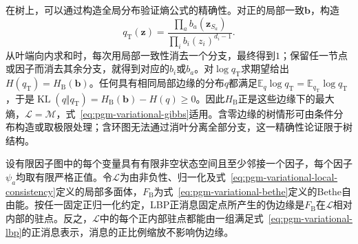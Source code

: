 在树上，可以通过构造全局分布验证熵公式的精确性。对正的局部一致$\bm b$，构造
\[
  q_{\mathrm T}(\bm z)=
    \frac{\prod_a b_a(\bm z_{S_a})}
         {\prod_i b_i(z_i)^{d_i-1}}.
\]
从叶端向内求和时，每次用局部一致性消去一个分支，最终得到$1$；保留任一节点或因子而消去其余分支，就得到对应的$b_i$或$b_a$。对$\log q_{\mathrm T}$求期望给出$H(q_{\mathrm T})=H_{\mathrm B}(\bm b)$。任何具有相同局部边缘的分布$q$都满足$\mathbb E_q\log q_{\mathrm T}=\mathbb E_{q_{\mathrm T}}\log q_{\mathrm T}$，于是$\operatorname{KL}(q\Vert q_{\mathrm T})=H_{\mathrm B}(\bm b)-H(q)\geq0$。因此$H_{\mathrm B}$正是这些边缘下的最大熵，$\mathcal L=\mathcal M$，式~\eqref{eq:pgm-variational-gibbs}适用。含零边缘的树情形可由条件分布构造或取极限处理；含环图无法通过消叶分离全部分支，这一精确性论证限于树结构。

\begin{theorem}[正消息固定点与Bethe驻点]
  \label{thm:pgm-variational-bp-stationary}
  设有限因子图中的每个变量具有有限非空状态空间且至少邻接一个因子，每个因子$\psi_a$均取有限严格正值。令$\mathcal L$为由非负性、归一化及式~\eqref{eq:pgm-variational-local-consistency}定义的局部多面体，$F_{\mathrm B}$为式~\eqref{eq:pgm-variational-bethe}定义的Bethe自由能。按任一固定正归一化约定，LBP正消息固定点所产生的伪边缘是$F_{\mathrm B}$在$\mathcal L$相对内部的驻点。反之，$\mathcal L$中的每个正内部驻点都能由一组满足式~\eqref{eq:pgm-variational-lbp}的正消息表示，消息的正比例缩放不影响伪边缘。
\end{theorem}
